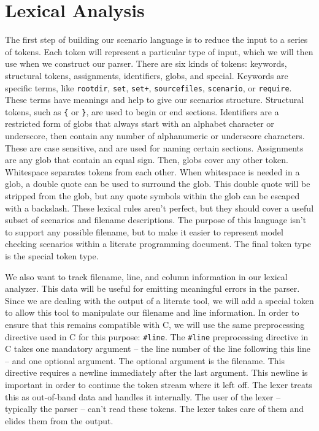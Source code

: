 \section{Lexical Analysis}

The first step of building our scenario language is to reduce the input to a
series of tokens. Each token will represent a particular type of input, which we
will then use when we construct our parser. There are six kinds of tokens:
keywords, structural tokens, assignments, identifiers, globs, and special.
Keywords are specific terms, like \verb/rootdir/, \verb/set/, \verb/set+/,
\verb/sourcefiles/, \verb/scenario/, or \verb/require/. These terms have
meanings and help to give our scenarios structure. Structural tokens, such as
\verb/{/ or \verb/}/, are used to begin or end sections. Identifiers are a
restricted form of globs that always start with an alphabet character or
underscore, then contain any number of alphanumeric or underscore characters.
These are case sensitive, and are used for naming certain sections. Assignments
are any glob that contain an equal sign. Then, globs cover any other token.
Whitespace separates tokens from each other. When whitespace is needed in a
glob, a double quote can be used to surround the glob. This double quote will be
stripped from the glob, but any quote symbols within the glob can be escaped
with a backslash.  These lexical rules aren't perfect, but they should cover a
useful subset of scenarios and filename descriptions.  The purpose of this
language isn't to support any possible filename, but to make it easier to
represent model checking scenarios within a literate programming document.  The
final token type is the special token type.

We also want to track filename, line, and column information in our lexical
analyzer.  This data will be useful for emitting meaningful errors in the
parser. Since we are dealing with the output of a literate tool, we will add a
special token to allow this tool to manipulate our filename and line
information. In order to ensure that this remains compatible with C, we will
use the same preprocessing directive used in C for this purpose: \verb/#line/.
The \verb/#line/ preprocessing directive in C takes one mandatory argument --
the line number of the line following this line -- and one optional argument.
The optional argument is the filename. This directive requires a newline
immediately after the last argument. This newline is important in order to
continue the token stream where it left off.  The lexer treats this as
out-of-band data and handles it internally. The user of the lexer -- typically
the parser -- can't read these tokens. The lexer takes care of them and elides
them from the output.

